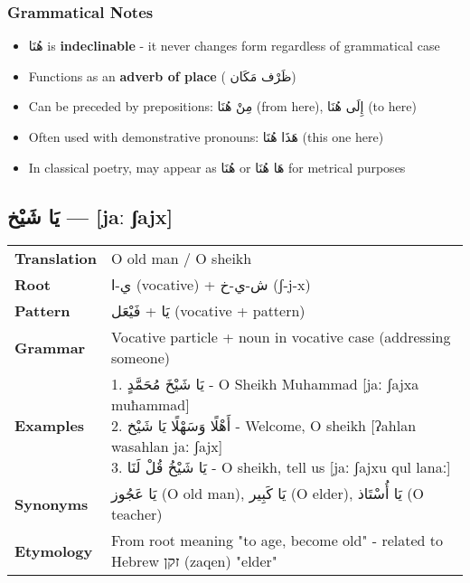 \documentclass[letterpaper,12pt]{article}
\begin{document}
\subsubsection*{Grammatical Notes}
\begin{itemize}
\item \textarabic{هُنَا} is \textbf{indeclinable} - it never changes form regardless of grammatical case
\item Functions as an \textbf{adverb of place} ( \textarabic{ظَرْف مَكَان})
\item Can be preceded by prepositions: \textarabic{مِنْ هُنَا} (from here), \textarabic{إِلَى هُنَا} (to here)
\item Often used with demonstrative pronouns: \textarabic{هَذَا هُنَا} (this one here)
\item In classical poetry, may appear as \textarabic{هُنَا} or \textarabic{هَا هُنَا} for metrical purposes
\end{itemize}

\subsection{\textarabic{يَا شَيْخ} — [jaː ʃajx]}

\begin{tabular}{p{3cm}p{10cm}}
\toprule
\textbf{Translation} & O old man / O sheikh \\
\textbf{Root} & \textarabic{ي-ا} (vocative) + \textarabic{ش-ي-خ} (ʃ-j-x) \\
\textbf{Pattern} & \textarabic{يَا} + \textarabic{فَيْعَل} (vocative + pattern) \\
\textbf{Grammar} & Vocative particle + noun in vocative case (addressing someone) \\
\textbf{Examples} & \makecell[l]{\parbox{9.5cm}{
1. \textarabic{يَا شَيْخَ مُحَمَّدٍ} - O Sheikh Muhammad [jaː ʃajxa muħammad]\\
2. \textarabic{أَهْلًا وَسَهْلًا يَا شَيْخ} - Welcome, O sheikh [ʔahlan wasahlan jaː ʃajx]\\
3. \textarabic{يَا شَيْخُ قُلْ لَنَا} - O sheikh, tell us [jaː ʃajxu qul lanaː]
}} \\
\midrule
\textbf{Synonyms} & \textarabic{يَا عَجُوز} (O old man), \textarabic{يَا كَبِير} (O elder), \textarabic{يَا أُسْتَاذ} (O teacher) \\
\textbf{Etymology} & From root meaning "to age, become old" - related to Hebrew \texthebrew{זקן} (zaqen) "elder" \\
\bottomrule
\end{tabular}
\end{document}
